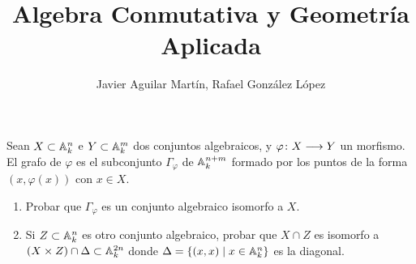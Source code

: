 \documentclass[twoside]{article}
\begin{document}
\title{Algebra Conmutativa y Geometría Aplicada}
\author{Javier Aguilar Martín, Rafael González López}
\maketitle
\begin{ejercicio}{4} Sean $X\subset \mathbb{A}_k^n$ e $Y\subset \mathbb{A}_k^m$ dos conjuntos algebraicos, y $\varphi\colon{X}\longrightarrow{Y}$ un morfismo. El grafo de $\varphi$ es el subconjunto $\Gamma_\varphi$ de $\mathbb{A}_k^{n+m}$ formado por los puntos de la forma $(x,\varphi(x))$ con $x\in X$.
\begin{enumerate}
\item Probar que $\Gamma_\varphi$ es un conjunto algebraico isomorfo a $X$.
\item Si $Z\subset \mathbb{A}_k^n$ es otro conjunto algebraico, probar que $X\cap Z$ es isomorfo a $(X\times Z)\cap \Delta \subset \mathbb{A}^{2n}_k$ donde $\Delta =\{(x,x)\mid x \in \mathbb{A}_k^n\}$ es la diagonal.
\end{enumerate}
\end{ejercicio}
\end{document}
